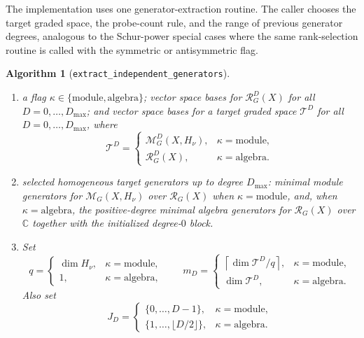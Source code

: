 \documentclass[11pt]{article}
\newcommand{\dsC}{\mathbb{C}}
\newcommand{\scM}{\mathcal{M}}
\newcommand{\scR}{\mathcal{R}}
\newcommand{\scT}{\mathcal{T}}
\newtheorem{algorithm}[theorem]{Algorithm}
\theoremstyle{definition}
\begin{document}
The implementation uses one generator-extraction routine.
The caller chooses the target graded space, the probe-count rule, and the range of previous generator degrees, analogous to the Schur-power special cases where the same rank-selection routine is called with the symmetric or antisymmetric flag.

\begin{algorithm}[\texttt{extract\_independent\_generators}]\label{alg:extract-independent-generators}

  \phantom{}
  \begin{enumerate}[label=\textbf{Step \arabic*.},leftmargin=2.8cm]

    \item[\textbf{Input:}] a flag $\kappa\in\{\mathrm{module},\mathrm{algebra}\}$; vector space bases for $\scR_G^D(X)$ for all $D=0,\dots,D_{\max}$; and vector space bases for a target graded space $\scT^D$ for all $D=0,\dots,D_{\max}$, where
    \[
      \scT^D=
      \begin{cases}
        \scM_G^D(X,H_\nu), & \kappa=\mathrm{module},\\
        \scR_G^D(X), & \kappa=\mathrm{algebra}.
      \end{cases}
    \]

    \item[\textbf{Output:}] selected homogeneous target generators up to degree $D_{\max}$: minimal module generators for $\scM_G(X,H_\nu)$ over $\scR_G(X)$ when $\kappa=\mathrm{module}$, and, when $\kappa=\mathrm{algebra}$, the positive-degree minimal algebra generators for $\scR_G(X)$ over $\dsC$ together with the initialized degree-$0$ block.

    \item Set
    \[
      q=
      \begin{cases}
        \dim H_\nu, & \kappa=\mathrm{module},\\
        1, & \kappa=\mathrm{algebra},
      \end{cases}
      \qquad
      m_D=
      \begin{cases}
        \left\lceil \dim\scT^D/q\right\rceil, & \kappa=\mathrm{module},\\
        \dim\scT^D, & \kappa=\mathrm{algebra}.
      \end{cases}
    \]
    Also set
    \[
      J_D=
      \begin{cases}
        \{0,\dots,D-1\}, & \kappa=\mathrm{module},\\
        \{1,\dots,\lfloor D/2\rfloor\}, & \kappa=\mathrm{algebra}.
      \end{cases}
    \]


\end{enumerate}
\end{algorithm}
\end{document}
